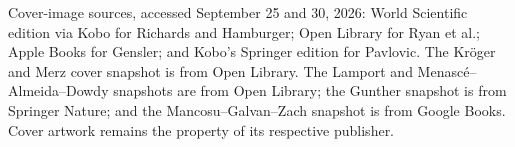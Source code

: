 \vfill
{\footnotesize Cover-image sources, accessed September 25 and 30, 2026:
World Scientific edition via Kobo for Richards and Hamburger;
Open Library for Ryan et al.; Apple Books for Gensler; and Kobo's Springer
edition for Pavlovic. The Kr{\"o}ger and Merz cover snapshot is from Open Library.
The Lamport and Menasc{\'e}--Almeida--Dowdy snapshots are from Open Library; the
Gunther snapshot is from Springer Nature; and the Mancosu--Galvan--Zach
snapshot is from Google Books.
Cover artwork remains the property of its respective publisher.}
